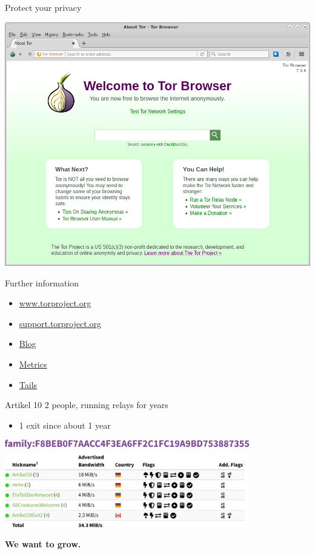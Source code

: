 \documentclass[aspectratio=169,10pt]{beamer}
\begin{document}
  
  \begin{frame}[fragile]{Protect your privacy}
    \begin{center}
      \href{https://www.torproject.org/projects/torbrowser.html.en}{\includegraphics[height=0.85\textheight]{img/torbrowser.png}}
    \end{center}
  \end{frame}
  
  
  \begin{frame}[fragile]{Further information}
    \begin{itemize}
      \item \href{https://www.torproject.org/}{www.torproject.org}
      \item \href{https://support.torproject.org/}{support.torproject.org}
      \item \href{https://blog.torproject.org/}{Blog}
      \item \href{https://metrics.torproject.org/}{Metrics}
      \item \href{https://tails.boum.org/}{Tails}
    \end{itemize}
  \end{frame}
  

  \begin{frame}[fragile]{Artikel 10}
    2 people, running relays for years
    \begin{itemize}
      \item 1 exit since about 1 year
    \end{itemize}  
    \begin{center}
      \href{https://metrics.torproject.org/rs.html#search/family:F8BEB0F7AACC4F3EA6FF2C1FC19A9BD753887355}{\includegraphics[width=0.8\textwidth]{img/family.png}}
    \end{center}
    \textbf{We want to grow.}
  \end{frame}
  
\end{document}
